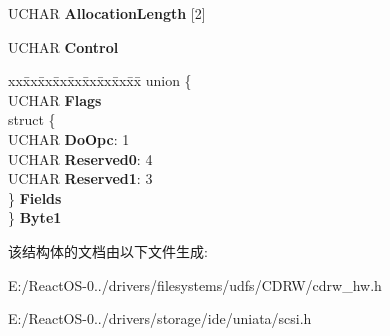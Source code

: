 \begin{DoxyCompactItemize}
\begin{tabbing}
\end{tabbing}\item 
\mbox{\label{struct___c_d_b_1_1___s_e_n_d___o_p_c___i_n_f_o_acecf64b1275f33571630d2106e1896d2}} 
U\+C\+H\+AR {\bfseries Allocation\+Length} \mbox{[}2\mbox{]}
\item 
\mbox{\label{struct___c_d_b_1_1___s_e_n_d___o_p_c___i_n_f_o_a8a0047f8d97e3df75f398d9d6c07ba82}} 
U\+C\+H\+AR {\bfseries Control}
\item 
\mbox{\label{struct___c_d_b_1_1___s_e_n_d___o_p_c___i_n_f_o_a2aa3125c53ed5f335a3cc1bd5f6b8c81}} 
\begin{tabbing}
xx\=xx\=xx\=xx\=xx\=xx\=xx\=xx\=xx\=\kill
union \{\\
\>UCHAR {\bfseries Flags}\\
\>struct \{\\
\>\>UCHAR {\bfseries DoOpc}: 1\\
\>\>UCHAR {\bfseries Reserved0}: 4\\
\>\>UCHAR {\bfseries Reserved1}: 3\\
\>\} {\bfseries Fields}\\
\} {\bfseries Byte1}\\

\end{tabbing}\end{DoxyCompactItemize}


该结构体的文档由以下文件生成\+:\begin{DoxyCompactItemize}
\item 
E\+:/\+React\+O\+S-\/0../drivers/filesystems/udfs/\+C\+D\+R\+W/cdrw\+\_\+hw.\+h\item 
E\+:/\+React\+O\+S-\/0../drivers/storage/ide/uniata/scsi.\+h\end{DoxyCompactItemize}
